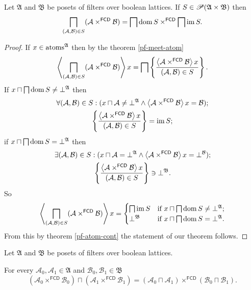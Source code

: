 \begin{thm}
Let $\mathfrak{A}$ and $\mathfrak{B}$ be posets of filters over
boolean lattices. If $S\in\mathscr{P}(\mathfrak{A}\times\mathfrak{B})$
then
\[
\bigsqcap_{(\mathcal{A},\mathcal{B})\in S}(\mathcal{A}\times^{\mathsf{FCD}}\mathcal{B})=\bigsqcap\operatorname{dom} S\times^{\mathsf{FCD}}\bigsqcap\operatorname{im} S.
\]
\end{thm}
\begin{proof}
If $x\in\operatorname{atoms}^{\mathfrak{A}}$ then by the theorem \ref{pf-meet-atom}
\[
\left\langle \bigsqcap_{(\mathcal{A},\mathcal{B})\in S}(\mathcal{A}\times^{\mathsf{FCD}}\mathcal{B})\right\rangle x=\bigsqcap\left\{ \frac{\left\langle \mathcal{A}\times^{\mathsf{FCD}}\mathcal{B}\right\rangle x}{(\mathcal{A},\mathcal{B})\in S}\right\}.
\]
If $x\sqcap\bigsqcap\operatorname{dom} S\ne\bot^{\mathfrak{A}}$ then
\begin{gather*}
\forall(\mathcal{A},\mathcal{B})\in S:(x\sqcap\mathcal{A}\ne\bot^{\mathfrak{A}}\land\left\langle \mathcal{A}\times^{\mathsf{FCD}}\mathcal{B}\right\rangle x=\mathcal{B});\\
\left\{ \frac{\left\langle \mathcal{A}\times^{\mathsf{FCD}}\mathcal{B}\right\rangle x}{(\mathcal{A},\mathcal{B})\in S}\right\}=\operatorname{im} S;
\end{gather*}
if $x\sqcap\bigsqcap\operatorname{dom} S=\bot^{\mathfrak{A}}$ then
\begin{gather*}
\exists(\mathcal{A},\mathcal{B})\in S:(x\sqcap\mathcal{A}=\bot^{\mathfrak{A}}\land\left\langle \mathcal{A}\times^{\mathsf{FCD}}\mathcal{B}\right\rangle x=\bot^{\mathcal{B}});\\
\left\{ \frac{\left\langle \mathcal{A}\times^{\mathsf{FCD}}\mathcal{B}\right\rangle x}{(\mathcal{A},\mathcal{B})\in S}\right\}\ni\bot^{\mathfrak{B}}.
\end{gather*}
So
\[
\left\langle \bigsqcap_{(\mathcal{A},\mathcal{B})\in S}(\mathcal{A}\times^{\mathsf{FCD}}\mathcal{B})\right\rangle x=\begin{cases}
\bigsqcap\operatorname{im} S & \text{if }x\sqcap\bigsqcap\operatorname{dom} S\ne\bot^{\mathfrak{A}};\\
\bot^{\mathfrak{B}} & \text{if }x\sqcap\bigsqcap\operatorname{dom} S=\bot^{\mathfrak{A}}.
\end{cases}
\]
From this by theorem \ref{pf-atom-cont} the statement of our theorem
follows.\end{proof}
\begin{cor}
Let $\mathfrak{A}$ and $\mathfrak{B}$ be posets of filters over
boolean lattices.

For every $\mathcal{A}_{0},\mathcal{A}_{1}\in\mathfrak{A}$ and $\mathcal{B}_{0},\mathcal{B}_{1}\in\mathfrak{B}$
\[
(\mathcal{A}_{0}\times^{\mathsf{FCD}}\mathcal{B}_{0})\sqcap(\mathcal{A}_{1}\times^{\mathsf{FCD}}\mathcal{B}_{1})=(\mathcal{A}_{0}\sqcap\mathcal{A}_{1})\times^{\mathsf{FCD}}(\mathcal{B}_{0}\sqcap\mathcal{B}_{1}).
\]
\end{cor}
